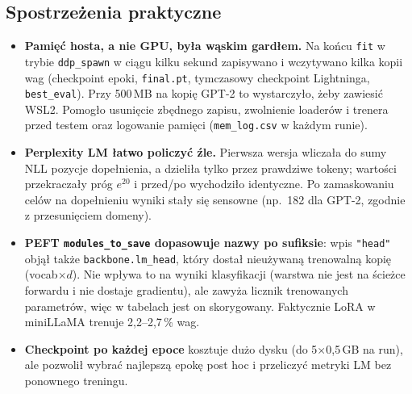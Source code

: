 \documentclass[11pt,a4paper]{article}
\begin{document}
\subsection{Spostrzeżenia praktyczne}
\begin{itemize}
  \item \textbf{Pamięć hosta, a nie GPU, była wąskim gardłem.} Na końcu \texttt{fit} w trybie
        \texttt{ddp\_spawn} w ciągu kilku sekund zapisywano i wczytywano kilka kopii wag (checkpoint
        epoki, \texttt{final.pt}, tymczasowy checkpoint Lightninga, \texttt{best\_eval}). Przy 500\,MB
        na kopię GPT-2 to wystarczyło, żeby zawiesić WSL2. Pomogło usunięcie zbędnego zapisu,
        zwolnienie loaderów i trenera przed testem oraz logowanie pamięci
        (\texttt{mem\_log.csv} w każdym runie).
  \item \textbf{Perplexity LM łatwo policzyć źle.} Pierwsza wersja wliczała do sumy NLL pozycje
        dopełnienia, a dzieliła tylko przez prawdziwe tokeny; wartości przekraczały próg $e^{20}$
        i przed/po wychodziło identyczne. Po zamaskowaniu celów na dopełnieniu wyniki stały się
        sensowne (np.\ 182 dla GPT-2, zgodnie z przesunięciem domeny).
  \item \textbf{PEFT \texttt{modules\_to\_save} dopasowuje nazwy po sufiksie}: wpis \texttt{"head"}
        objął także \texttt{backbone.lm\_head}, który dostał nieużywaną trenowalną kopię
        (vocab$\times d$). Nie wpływa to na wyniki klasyfikacji (warstwa nie jest na ścieżce forwardu
        i nie dostaje gradientu), ale zawyża licznik trenowanych parametrów, więc w tabelach jest
        on skorygowany. Faktycznie LoRA w miniLLaMA trenuje 2,2--2,7\,\% wag.
  \item \textbf{Checkpoint po każdej epoce} kosztuje dużo dysku (do 5$\times$0,5\,GB na run), ale
        pozwolił wybrać najlepszą epokę post hoc i przeliczyć metryki LM bez ponownego treningu.
\end{itemize}
\end{document}
